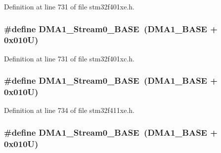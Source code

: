 Definition at line 731 of file stm32f401xe.\+h.

\subsubsection[{\texorpdfstring{D\+M\+A1\+\_\+\+Stream0\+\_\+\+B\+A\+SE}{DMA1_Stream0_BASE}}]{\setlength{\rightskip}{0pt plus 5cm}\#define D\+M\+A1\+\_\+\+Stream0\+\_\+\+B\+A\+SE~({\bf D\+M\+A1\+\_\+\+B\+A\+SE} + 0x010\+U)}\hypertarget{group___peripheral__registers__structures_ga0d3c52aa35dcc68f78b704dfde57ba95}{}\label{group___peripheral__registers__structures_ga0d3c52aa35dcc68f78b704dfde57ba95}


Definition at line 731 of file stm32f401xc.\+h.

\subsubsection[{\texorpdfstring{D\+M\+A1\+\_\+\+Stream0\+\_\+\+B\+A\+SE}{DMA1_Stream0_BASE}}]{\setlength{\rightskip}{0pt plus 5cm}\#define D\+M\+A1\+\_\+\+Stream0\+\_\+\+B\+A\+SE~({\bf D\+M\+A1\+\_\+\+B\+A\+SE} + 0x010\+U)}\hypertarget{group___peripheral__registers__structures_ga0d3c52aa35dcc68f78b704dfde57ba95}{}\label{group___peripheral__registers__structures_ga0d3c52aa35dcc68f78b704dfde57ba95}


Definition at line 734 of file stm32f411xe.\+h.

\subsubsection[{\texorpdfstring{D\+M\+A1\+\_\+\+Stream0\+\_\+\+B\+A\+SE}{DMA1_Stream0_BASE}}]{\setlength{\rightskip}{0pt plus 5cm}\#define D\+M\+A1\+\_\+\+Stream0\+\_\+\+B\+A\+SE~({\bf D\+M\+A1\+\_\+\+B\+A\+SE} + 0x010\+U)}\hypertarget{group___peripheral__registers__structures_ga0d3c52aa35dcc68f78b704dfde57ba95}{}\label{group___peripheral__registers__structures_ga0d3c52aa35dcc68f78b704dfde57ba95}


